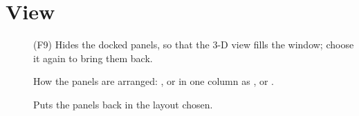 \section{View}
\begin{description}
	\item[] (\textsf{F9}) Hides the docked panels, so that the 3-D view fills the window; choose it again to bring them back.
	\item[] How the panels are arranged: , or in one column as ,  or .
	\item[] Puts the panels back in the layout chosen.
\end{description}

